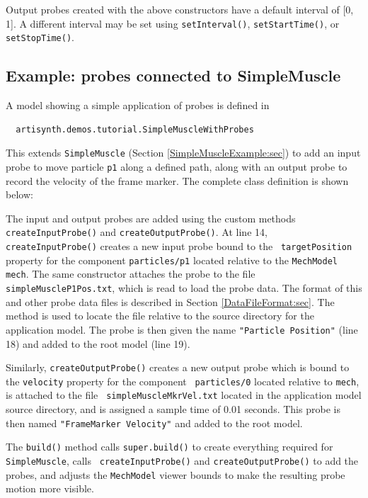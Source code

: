 Output probes created with the above constructors have a default
interval of [0, 1]. A different interval may be set using
{\tt setInterval()}, {\tt setStartTime()}, or {\tt setStopTime()}.

\subsection{Example: probes connected to SimpleMuscle}
\label{SimpleMuscleWithProbes:sec}

A model showing a simple application of probes is defined in
%
\begin{verbatim}
  artisynth.demos.tutorial.SimpleMuscleWithProbes
\end{verbatim}
%
This extends {\tt SimpleMuscle} (Section
\ref{SimpleMuscleExample:sec}) to add an input probe to move particle
{\tt p1} along a defined path, along with an output probe to record
the velocity of the frame marker.  The complete class definition is
shown below:
%
\lstset{numbers=left}

\lstset{numbers=none}
%
The input and output probes are added using the custom methods {\tt
createInputProbe()} and {\tt createOutputProbe()}. At line 14, {\tt
createInputProbe()} creates a new input probe bound to the {\tt
targetPosition} property for the component {\tt particles/p1} located
relative to the {\tt MechModel} {\tt mech}. The same constructor
attaches the probe to the file\\ {\tt simpleMuscleP1Pos.txt}, which is
read to load the probe data. The format of this and other probe data
files is described in Section \ref{DataFileFormat:sec}.  The method
is used to locate the file relative to the source directory for the
application model. The probe is then given the name {\tt "Particle
Position"} (line 18) and added to the root model (line 19).

Similarly, {\tt createOutputProbe()} creates a new output probe which
is bound to the {\tt velocity} property for the component {\tt
particles/0} located relative to {\tt mech}, is attached to the file {\tt
simpleMuscleMkrVel.txt} located in the application model source
directory, and is assigned a sample time of 0.01 seconds. This probe is
then named {\tt "FrameMarker Velocity"} and added to the root model.

The {\tt build()} method calls {\tt super.build()} to create
everything required for {\tt SimpleMuscle}, calls {\tt
createInputProbe()} and {\tt createOutputProbe()} to add the probes,
and adjusts the {\tt MechModel} viewer bounds to make the resulting
probe motion more visible.

